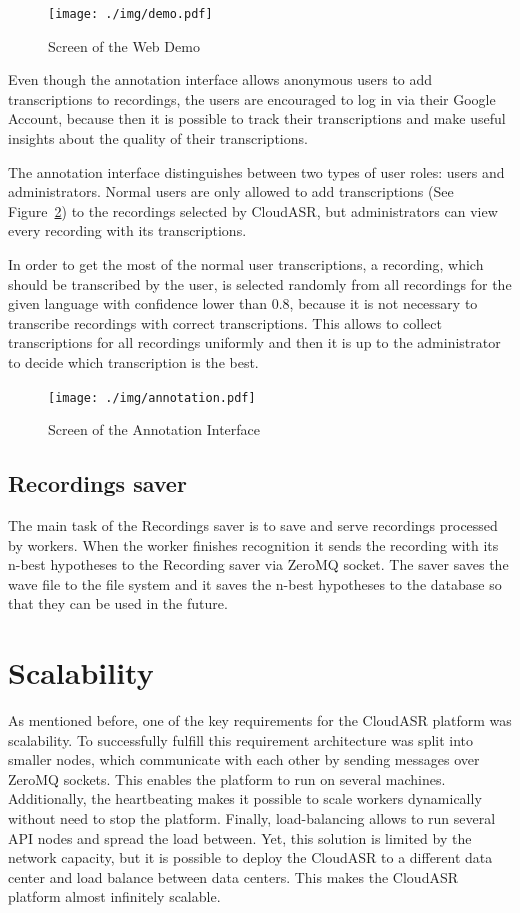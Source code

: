 \begin{figure}[h]
  \centering
  \texttt{[image: ./img/demo.pdf]}

  \caption{Screen of the Web Demo}
  \label{fig:webdemo}
\end{figure}

Even though the annotation interface allows anonymous users to add transcriptions to recordings,
  the users are encouraged to log in via their Google Account,
  because then it is possible to track their transcriptions
    and make useful insights about the quality of their transcriptions.

The annotation interface distinguishes between two types of user roles: users and administrators.
Normal users are only allowed to add transcriptions (See Figure~\ref{fig:annotation-interface}) to the recordings selected by CloudASR,
  but administrators can view every recording with its transcriptions.

In order to get the most of the normal user transcriptions,
  a recording, which should be transcribed by the user,
  is selected randomly from all recordings for the given language with confidence lower than 0.8,
    because it is not necessary to transcribe recordings with correct transcriptions.
This allows to collect transcriptions for all recordings uniformly
  and then it is up to the administrator to decide which transcription is the best.

\begin{figure}[h]
  \centering
  \texttt{[image: ./img/annotation.pdf]}

  \caption{Screen of the Annotation Interface}
  \label{fig:annotation-interface}
\end{figure}



\subsection{Recordings saver}
The main task of the Recordings saver is to save and serve recordings processed by workers.
When the worker finishes recognition
  it sends the recording with its n-best hypotheses to the Recording saver via ZeroMQ socket.
The saver saves the wave file to the file system
  and it saves the n-best hypotheses to the database so that they can be used in the future.


\section{Scalability}
As mentioned before, one of the key requirements for the CloudASR platform was scalability.
To successfully fulfill this requirement architecture was split into smaller nodes,
  which communicate with each other by sending messages over ZeroMQ sockets.
This enables the platform to run on several machines.
Additionally, the heartbeating makes it possible to scale workers dynamically without need to stop the platform.
Finally, load-balancing allows to run several API nodes and spread the load between.
Yet, this solution is limited by the network capacity,
  but it is possible to deploy the CloudASR to a different data center
  and load balance between data centers.
This makes the CloudASR platform almost infinitely scalable.


